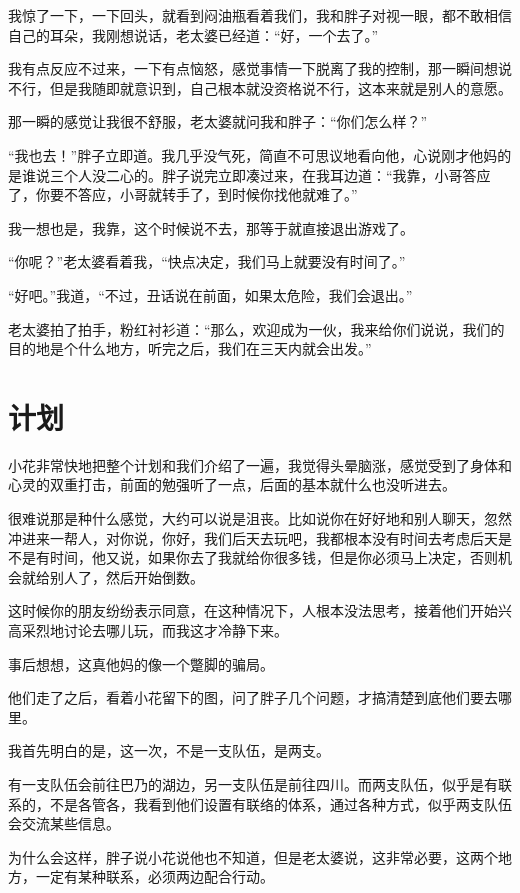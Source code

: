 我惊了一下，一下回头，就看到闷油瓶看着我们，我和胖子对视一眼，都不敢相信自己的耳朵，我刚想说话，老太婆已经道：“好，一个去了。”

我有点反应不过来，一下有点恼怒，感觉事情一下脱离了我的控制，那一瞬间想说不行，但是我随即就意识到，自己根本就没资格说不行，这本来就是别人的意愿。

那一瞬的感觉让我很不舒服，老太婆就问我和胖子：“你们怎么样？”

“我也去！”胖子立即道。我几乎没气死，简直不可思议地看向他，心说刚才他妈的是谁说三个人没二心的。胖子说完立即凑过来，在我耳边道：“我靠，小哥答应了，你要不答应，小哥就转手了，到时候你找他就难了。”

我一想也是，我靠，这个时候说不去，那等于就直接退出游戏了。

“你呢？”老太婆看着我，“快点决定，我们马上就要没有时间了。”

“好吧。”我道，“不过，丑话说在前面，如果太危险，我们会退出。”

老太婆拍了拍手，粉红衬衫道：“那么，欢迎成为一伙，我来给你们说说，我们的目的地是个什么地方，听完之后，我们在三天内就会出发。”

\chapter{计划}

小花非常快地把整个计划和我们介绍了一遍，我觉得头晕脑涨，感觉受到了身体和心灵的双重打击，前面的勉强听了一点，后面的基本就什么也没听进去。

很难说那是种什么感觉，大约可以说是沮丧。比如说你在好好地和别人聊天，忽然冲进来一帮人，对你说，你好，我们后天去玩吧，我都根本没有时间去考虑后天是不是有时间，他又说，如果你去了我就给你很多钱，但是你必须马上决定，否则机会就给别人了，然后开始倒数。

这时候你的朋友纷纷表示同意，在这种情况下，人根本没法思考，接着他们开始兴高采烈地讨论去哪儿玩，而我这才冷静下来。

事后想想，这真他妈的像一个蹩脚的骗局。

他们走了之后，看着小花留下的图，问了胖子几个问题，才搞清楚到底他们要去哪里。

我首先明白的是，这一次，不是一支队伍，是两支。

有一支队伍会前往巴乃的湖边，另一支队伍是前往四川。而两支队伍，似乎是有联系的，不是各管各，我看到他们设置有联络的体系，通过各种方式，似乎两支队伍会交流某些信息。

为什么会这样，胖子说小花说他也不知道，但是老太婆说，这非常必要，这两个地方，一定有某种联系，必须两边配合行动。

